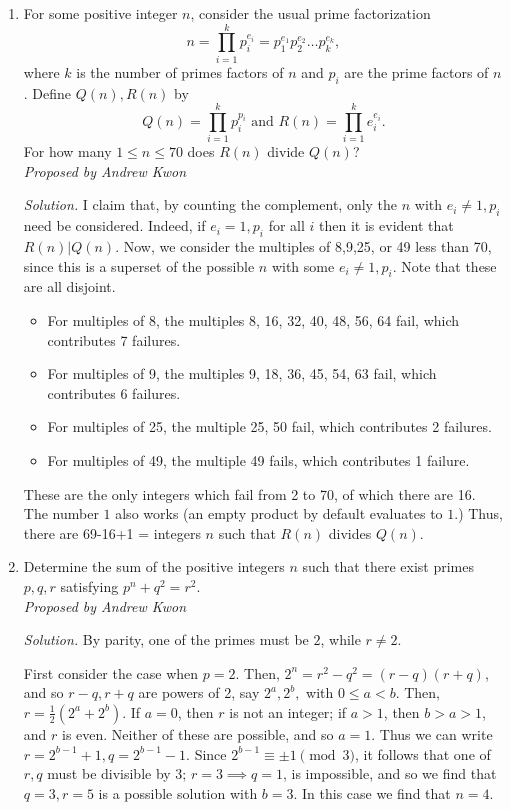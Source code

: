 \documentclass[10pt]{article}
\newcommand{\proposed}[1]
{
\vspace{5pt}
\noindent\textit{Proposed by #1}
}
\newcommand{\solution}
{
\vspace{5pt}
\noindent\textit{Solution.}\qquad
}
\begin{document}
\begin{enumerate}
\item For some positive integer $n$, consider the usual prime factorization \[n =
	\displaystyle \prod_{i=1}^{k} p_{i}^{e_{i}}=p_1^{e_1}p_2^{e_2}\ldots p_k^{e_k},\] where $k$ is the number of
	primes factors of $n$ and $p_{i}$ are the prime factors of $n$. Define
	$Q(n), R(n)$ by
	\[
		Q(n) = \prod_{i=1}^{k} p_{i}^{p_{i}} \text{ and } R(n) =
		\prod_{i=1}^{k} e_{i}^{e_{i}}.
	\]
	For how many $1 \leq n \leq 70$ does $R(n)$ divide $Q(n)$?\\

\proposed{Andrew Kwon}

\solution I claim that, by counting the complement, only the $n$ with 
$e_{i} \neq 1, p_{i}$ need be considered. Indeed, if $e_{i} = 1, p_{i}$ for 
all $i$ then it is evident that $R(n) | Q(n)$. Now, we consider the multiples 
of 8,9,25, or 49 less than 70, since this is a superset of the possible $n$ 
with some $e_{i} \neq 1,p_{i}$. Note that these are all disjoint. 
\begin{itemize}
	\item For multiples of 8, the multiples 8, 16, 32, 40, 48, 56, 64 fail,
		which contributes 7 failures.
	\item For multiples of 9, the multiples 9, 18, 36, 45, 54, 63 fail,
		which contributes 6 failures.
	\item For multiples of 25, the multiple 25, 50 fail, which contributes 2
		failures.
	\item For multiples of 49, the multiple 49 fails, which contributes 1
		failure.
\end{itemize}
These are the only integers which fail from 2 to 70, of which there are 16.
The number $1$ also works (an empty product by default evaluates to $1$.)  Thus, there are 69-16+1 =  integers $n$ such that $R(n)$ divides $Q(n)$.

\item Determine the sum of the positive integers $n$ such that there exist primes
	$p,q,r$ satisfying $p^{n} + q^{2} = r^{2}$. \\

\proposed{Andrew Kwon}

\solution By parity, one of the primes must be $2$, while $r \neq 2$. \\
\par First consider the case when $p = 2$. Then, $2^{n} = r^{2} - q^{2} = (r-q)(r+q)$, 
and so $r-q, r+q$ are powers of 2, say $2^{a}, 2^{b},$ with $0 \leq a < b$. 
Then, $ r = \displaystyle \frac{1}{2}( 2^{a} + 2^{b} )$. If $a = 0$, then $r$ is
not an integer; if $a > 1$, then $b > a > 1$, and $r$ is even. Neither of these
are possible, and so $a = 1$. Thus we can write $r = 2^{b-1} + 1, q =
2^{b-1} -1 $. Since $2^{b-1} \equiv \pm 1 \pmod{3}$, it follows that one of
$r,q$ must be divisible by 3; $r =3 \implies q =1$, is impossible, and so we find
that $q = 3, r=5$ is a possible solution with $b = 3$. In this case we find that
$n = 4$.\\


\end{enumerate}
\end{document}

